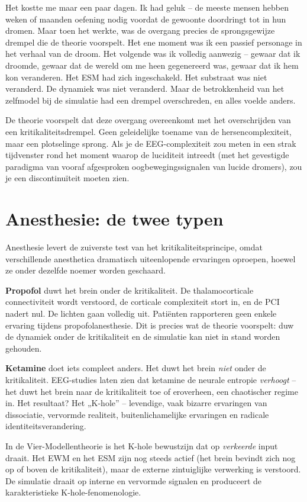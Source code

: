 \documentclass[11pt, twoside, openright]{book}
\begin{document}
Het kostte me maar een paar dagen. Ik had geluk -- de meeste mensen hebben weken of maanden oefening nodig voordat de gewoonte doordringt tot in hun dromen. Maar toen het werkte, was de overgang precies de sprongsgewijze drempel die de theorie voorspelt. Het ene moment was ik een passief personage in het verhaal van de droom. Het volgende was ik volledig aanwezig -- gewaar dat ik droomde, gewaar dat de wereld om me heen gegenereerd was, gewaar dat ik hem kon veranderen. Het ESM had zich ingeschakeld. Het substraat was niet veranderd. De dynamiek was niet veranderd. Maar de betrokkenheid van het zelfmodel bij de simulatie had een drempel overschreden, en alles voelde anders.

De theorie voorspelt dat deze overgang overeenkomt met het overschrijden van een kritikaliteitsdrempel. Geen geleidelijke toename van de hersencomplexiteit, maar een plotselinge sprong. Als je de EEG-complexiteit zou meten in een strak tijdvenster rond het moment waarop de luciditeit intreedt (met het gevestigde paradigma van vooraf afgesproken oogbewegingssignalen van lucide dromers), zou je een discontinuïteit moeten zien.

\section*{Anesthesie: de twee typen}

Anesthesie levert de zuiverste test van het kritikaliteitsprincipe, omdat verschillende anesthetica dramatisch uiteenlopende ervaringen oproepen, hoewel ze onder dezelfde noemer worden geschaard.

\textbf{Propofol} duwt het brein onder de kritikaliteit. De thalamocorticale connectiviteit wordt verstoord, de corticale complexiteit stort in, en de PCI nadert nul. De lichten gaan volledig uit. Patiënten rapporteren geen enkele ervaring tijdens propofolanesthesie. Dit is precies wat de theorie voorspelt: duw de dynamiek onder de kritikaliteit en de simulatie kan niet in stand worden gehouden.

\textbf{Ketamine} doet iets compleet anders. Het duwt het brein \textit{niet} onder de kritikaliteit. EEG-studies laten zien dat ketamine de neurale entropie \textit{verhoogt} -- het duwt het brein naar de kritikaliteit toe of eroverheen, een chaotischer regime in. Het resultaat? Het „K-hole” -- levendige, vaak bizarre ervaringen van dissociatie, vervormde realiteit, buitenlichamelijke ervaringen en radicale identiteitsverandering.

In de Vier-Modellentheorie is het K-hole bewustzijn dat op \textit{verkeerde} input draait. Het EWM en het ESM zijn nog steeds actief (het brein bevindt zich nog op of boven de kritikaliteit), maar de externe zintuiglijke verwerking is verstoord. De simulatie draait op interne en vervormde signalen en produceert de karakteristieke K-hole-fenomenologie.
\end{document}
